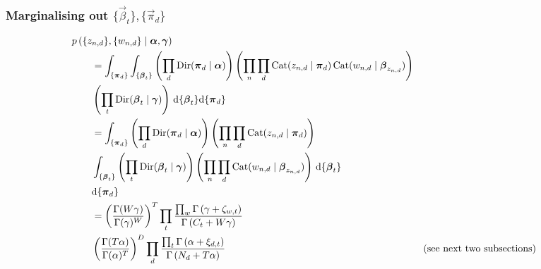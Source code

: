 \subsubsection{Marginalising out $\{\vec \beta_t\}, \{\vec \pi_d\}$}
\begin{align}
    \hspace{2em}&\hspace{-2em}
    p\left(\{z_{n, d}\}, \{w_{n, d}\} \given \vec \alpha, \vec \gamma\right) \nonumber\\
    &= \int_{\{\vec \pi_d\}} \int_{\{\vec \beta_t\}}
        \left(
            \prod_d \Dir(\vec \pi_d \given \vec \alpha)
        \right)
        \left(
            \prod_n \prod_d \Cat(z_{n, d} \given \vec \pi_d) \Cat(w_{n, d} \given \vec \beta_{z_{n, d}})
        \right) \nonumber\\
    &
        \left(
            \prod_t \Dir(\vec \beta_t \given \vec \gamma)
        \right)
    \,\mathrm d\{\vec \beta_t\}\mathrm d\{\vec \pi_d\}\nonumber\\
    &=
    \int_{\{\vec \pi_d\}}
        \left(
            \prod_d \Dir(\vec \pi_d \given \vec \alpha)
        \right)
        \left(
            \prod_n \prod_d \Cat(z_{n, d} \given \vec \pi_d)
        \right) \nonumber\\
    &
        \int_{\{\vec \beta_t\}}
            \left(
                \prod_t \Dir(\vec \beta_t \given \vec \gamma)
            \right)
            \left(
                \prod_n \prod_d \Cat(w_{n, d} \given \vec \beta_{z_{n, d}})
            \right)
            \,\mathrm d\{\vec \beta_t\} \nonumber\\
    &
    \mathrm d\{\vec \pi_d\} \nonumber\\
    &=
        \left(
            \frac
            {
                \Gamma(W \gamma)
            }
            {
                \Gamma(\gamma)^W
            }
        \right)^T
        \prod_t
            \frac
            {
                \prod_w \Gamma\left(\gamma + \zeta_{w, t}\right)
            }
            {
                \Gamma\left(C_t + W\gamma\right)
            } \nonumber\\
    &
        \left(
            \frac
            {
                \Gamma(T \alpha)
            }
            {
                \Gamma(\alpha)^T
            }
        \right)^D
        \prod_d
            \frac
            {
                \prod_t \Gamma\left(\alpha + \xi_{d, t}\right)
            }
            {
                \Gamma\left(N_d + T \alpha\right)
            } &&\text{(see next two subsections)}
\end{align}
